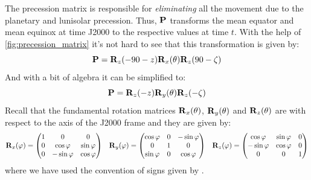 \documentclass[../main.tex]{subfiles}
\begin{document}
The precession matrix is responsible for \emph{eliminating} all the movement due to the planetary and lunisolar precession. Thus, $\boldsymbol{\mathrm{P}}$ transforms the mean equator and mean equinox at time J2000 to the respective values at time $t$. With the help of \cref{fig:precession_matrix} it's not hard to see that this transformation is given by:
\begin{equation}
  \boldsymbol{\mathrm{P}}=\boldsymbol{\mathrm{R}}_z(-90-z)\boldsymbol{\mathrm{R}}_x(\theta)\boldsymbol{\mathrm{R}}_z(90-\zeta)
\end{equation}
And with a bit of algebra it can be simplified to:
\begin{equation}
  \boldsymbol{\mathrm{P}}=\boldsymbol{\mathrm{R}}_z(-z)\boldsymbol{\mathrm{R}}_y(\theta)\boldsymbol{\mathrm{R}}_z(-\zeta)
\end{equation}
Recall that the fundamental rotation matrices $\boldsymbol{\mathrm{R}}_x(\theta)$, $\boldsymbol{\mathrm{R}}_y(\theta)$ and $\boldsymbol{\mathrm{R}}_z(\theta)$ are with respect to the axis of the J2000 frame and they are given by:
\begin{equation}
  \boldsymbol{\mathrm{R}}_x(\varphi)=\begin{pmatrix}
    1 & 0            & 0           \\
    0 & \cos\varphi  & \sin\varphi \\
    0 & -\sin\varphi & \cos\varphi
  \end{pmatrix}\;\;\;
  \boldsymbol{\mathrm{R}}_y(\varphi)=\begin{pmatrix}
    \cos\varphi & 0 & -\sin\varphi \\
    0           & 1 & 0            \\
    \sin\varphi & 0 & \cos\varphi
  \end{pmatrix}\;\;\;
  \boldsymbol{\mathrm{R}}_z(\varphi)=\begin{pmatrix}
    \cos\varphi  & \sin\varphi & 0 \\
    -\sin\varphi & \cos\varphi & 0 \\
    0            & 0           & 1
  \end{pmatrix}
\end{equation}
where we have used the convention of signs given by \cite{goldstein}.
\end{document}
